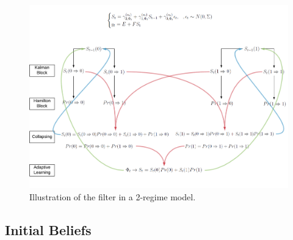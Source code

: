 \documentclass[12pt,reqno]{article}
\numberwithin{equation}{section}
\begin{document}
\begin{figure}[H]

\caption{Illustration of the filter in a 2-regime model.} 
\label{filter_km_illustration}
\includegraphics[scale=0.6]{zlb_filter.pdf}


\end{figure}


\subsection{Initial Beliefs}
\end{document}
